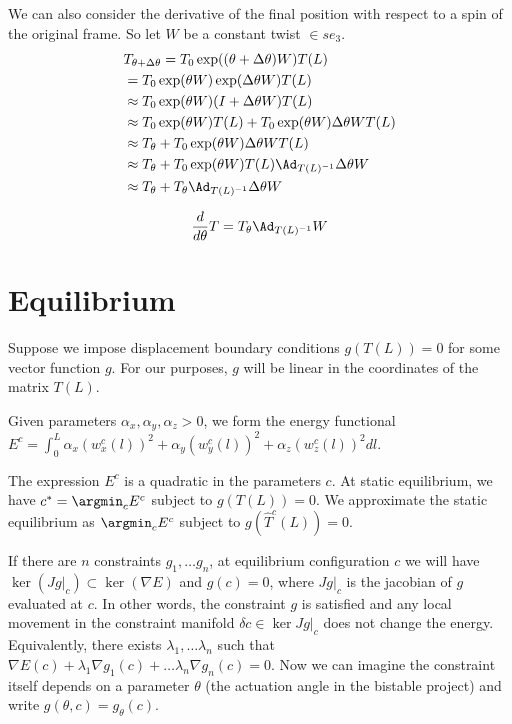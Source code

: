 \documentclass[12pt]{article}
\begin{document}
We can also consider the derivative of the final position with respect to a spin of the original frame. So let $W$ be a constant twist $\in se_3$.
\[
\begin{aligned}
  &T_{\theta + \Delta \theta} = T_0 \exp((\theta + \Delta \theta) W) T(L) \\
  & = T_0 \exp(\theta W) \exp(\Delta \theta W) T(L) \\
  & \approx T_0 \exp(\theta W)(I + \Delta \theta W) T(L) \\
  & \approx T_0 \exp(\theta W) T(L) + T_0 \exp(\theta W) \Delta \theta W T(L) \\
  & \approx T_\theta + T_0 \exp(\theta W) \Delta \theta W T(L) \\
  & \approx T_\theta + T_0 \exp(\theta W) T(L) \Ad_{T(L)^{-1}} \Delta \theta W \\
  & \approx T_\theta + T_\theta \Ad_{T(L)^{-1}} \Delta \theta W \\
\end{aligned}
\]

$$ \frac{d}{d\theta} T = T_\theta \Ad_{T(L)^{-1}} W$$

\section{Equilibrium}
Suppose we impose displacement boundary conditions $g(T(L)) = 0$
for some vector function $g$. For our purposes, $g$ will be linear
in the coordinates of the matrix $T(L)$.

Given parameters $\alpha_x, \alpha_y, \alpha_z > 0$, we form the
energy functional $E^c = \int_0^L \alpha_x (w_x^{c}(l))^2 + \alpha_y (w_y^c(l))^2 + \alpha_z (w_z^{c}(l))^2 dl$.

The expression $E^c$ is a quadratic in the parameters $c$. At static equilibrium,
we have $c^* = \argmin_c E^c$ subject to $g(T(L)) = 0$. We approximate the static equilibrium as $\argmin_c E^c$ subject to $g(\hat T^c(L)) = 0.$

If there are $n$ constraints $g_1, \ldots g_n$, at equilibrium configuration $c$ we will have $\ker(Jg|_c) \subset \ker(\nabla E)$ and $g(c) = 0$, where $Jg|_c$ is the jacobian of $g$ evaluated at $c$. In other words, the constraint $g$ is satisfied and any local movement in the constraint manifold $\delta c \in \ker Jg|_c$ does not change the energy. Equivalently, there exists  $\lambda_1, \ldots \lambda_n$ such that
$\nabla E(c) + \lambda_1 \nabla g_1(c) + \ldots \lambda_n \nabla g_n(c) = 0$. Now we can imagine the constraint itself depends on a parameter $\theta$ (the actuation angle in the bistable project) and write $g(\theta, c) = g_\theta(c)$.
\end{document}
